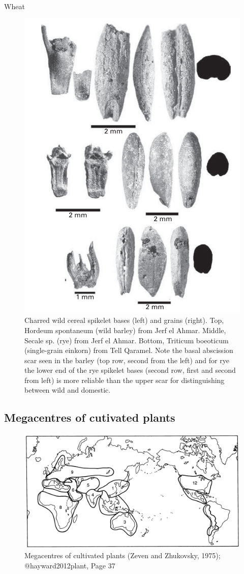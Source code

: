 \documentclass[ignorenonframetext,aspectratio=169]{beamer}
\begin{document}
\begin{frame}{Wheat}
\protect\hypertarget{wheat}{}

\begin{figure}
\includegraphics[width=0.3\linewidth]{./../images/charred_grass_grains} \caption{Charred wild cereal spikelet bases (left) and grains (right). Top, Hordeum spontaneum (wild barley) from Jerf el Ahmar. Middle, Secale sp. (rye) from Jerf el Ahmar. Bottom, Triticum boeoticum (single-grain einkorn) from Tell Qaramel. Note the basal abscission scar seen in the barley (top row, second from the left) and for rye the lower end of the rye spikelet bases (second row, first and second from left) is more reliable than the upper scar for distinguishing between wild and domestic.}\label{fig:wheat-barley-archaeology}
\end{figure}

\end{frame}

\hypertarget{megacentres-of-cutivated-plants}{%
\subsection{Megacentres of cutivated
plants}\label{megacentres-of-cutivated-plants}}

\begin{frame}{}
\protect\hypertarget{section-10}{}

\begin{figure}
\includegraphics[width=0.55\linewidth]{./../images/megacentres_cultivated} \caption{Megacentres of cultivated plants (Zeven and Zhukovsky, 1975); @hayward2012plant, Page 37}\label{fig:cultivated-megacentres}
\end{figure}

\end{frame}
\end{document}
